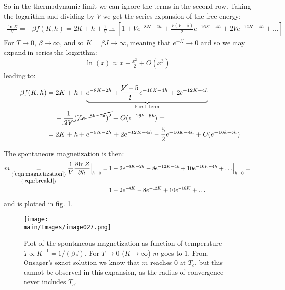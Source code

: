 \documentclass[../../main.tex]{subfiles}
\begin{document}
So in the thermodynamic limit we can ignore the terms in the second row. 
Taking the logarithm and dividing by $V$ we get the series expansion of the free energy:
\begin{align*}
    \frac{\ln Z}{V} = -\beta f(K,h) = 2K + h +\frac{1}{V} \ln \left[1+ V e^{-8K-2h} + \frac{V(V-5)}{2} e^{-16K - 4h} +2V e^{-12K - 4h} + \dots \right]   
\end{align*}
For $T \to 0$, $\beta \to \infty$, and so $K = \beta J \to \infty$, meaning that $e^{-K} \to 0$ and so we may expand in series the logarithm: 
\begin{align*}
    \ln (x) \approx x -\frac{x^2}{2} + O(x^3) 
\end{align*}
leading to:
\begin{align*}
    -\beta f(K,h) &= 2K+h + \underbrace{e^{-8K-2h} + \frac{\cancel{V}-5}{2} e^{-16K-4h} +2 e^{-12K-4h}}_{\text{First term}} \\
    &\quad\>-\cancel{\frac{1}{2V} (V e^{-8k-2h})^2 }+ O(e^{-16k-6h}) =\\
    &= 2 K +h + e^{-8K -2h} + 2 e^{-12K-4h} -\frac{5}{2}e^{-16K-4h} + O(e^{-16k - 6h}) 
\end{align*}

The spontaneous magnetization is then:
\begin{align}\nonumber
    m \underset{\substack{(\ref{eqn:magnetization})\\(\ref{eqn:break1})}}{=} \frac{1}{V} \pdv{\ln Z}{h} \Big|_{h=0} &= 1 -2 e^{-8K-2h}  -8e^{-12K-4h} + 10 e^{-16K-4h} + \dots \Big|_{h=0} =\\
    &= 1 - 2e^{-8K} -8 e^{-12K} + 10e^{-16K} + \dots \label{eqn:m-low}
\end{align}
and is plotted in fig. \ref{fig:m-expansion}.

\begin{figure}[H]
    \centering
    \texttt{[image: \\main/Images/image027.png]}
    \caption{Plot of the spontaneous magnetization as function of temperature $T \propto K^{-1} = 1/(\beta J)$. For $T \to 0$ ($K \to \infty$) $m$ goes to $1$. From Onsager's exact solution we know that $m$ reaches $0$ at $T_c$, but this cannot be observed in this expansion, as the radius of convergence never includes $T_c$. \label{fig:m-expansion}}
\end{figure}
\end{document}
